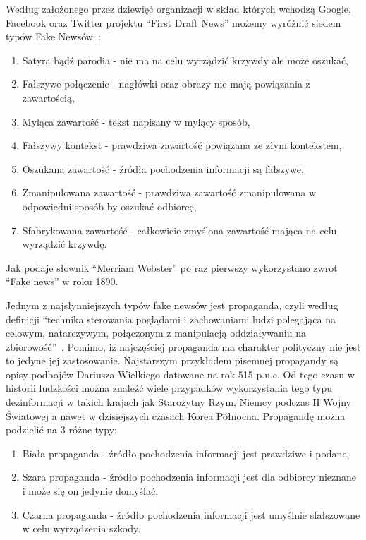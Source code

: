 Według założonego przez dziewięć organizacji w skład których wchodzą 
Google, Facebook oraz Twitter projektu ``First Draft News''
możemy wyróżnić siedem typów Fake Newsów~\cite{TypesOfFakeNews}:
\begin{enumerate}
    \item Satyra bądź parodia - nie ma na celu wyrządzić krzywdy ale może oszukać,
    \item Fałszywe połączenie - nagłówki oraz obrazy nie mają powiązania z zawartością,
    \item Myląca zawartość - tekst napisany w mylący sposób,
    \item Fałszywy kontekst - prawdziwa zawartość powiązana ze złym kontekstem,
    \item Oszukana zawartość - źródła pochodzenia informacji są fałszywe,
    \item Zmanipulowana zawartość - prawdziwa zawartość zmanipulowana w odpowiedni sposób by oszukać odbiorcę,
    \item Sfabrykowana zawartość - całkowicie zmyślona zawartość mająca na celu wyrządzić krzywdę.
\end{enumerate}
Jak podaje słownik ``Merriam Webster'' po raz pierwszy wykorzystano zwrot
``Fake news'' w roku 1890.


Jednym z najsłynniejszych typów fake newsów jest propaganda, czyli według 
definicji ``technika sterowania poglądami i zachowaniami ludzi polegająca na 
celowym, natarczywym, połączonym z manipulacją oddziaływaniu na zbiorowość''~\cite{SJP}.
Pomimo, iż najczęściej propaganda ma charakter polityczny nie jest to jedyne 
jej zastosowanie. Najstarszym przykładem pisemnej propagandy są opisy podbojów
Dariusza Wielkiego datowane na rok 515 p.n.e. Od tego czasu w historii ludzkości
można znaleźć wiele przypadków wykorzystania tego typu dezinformacji w takich krajach
jak Starożytny Rzym, Niemcy podczas II Wojny Światowej a nawet w dzisiejszych 
czasach Korea Północna.
Propagandę można podzielić na 3 różne typy:
\begin{enumerate}
    \item Biała propaganda - źródło pochodzenia informacji jest prawdziwe i podane,
    \item Szara propaganda - źródło pochodzenia informacji jest dla odbiorcy nieznane i może się on jedynie domyślać,
    \item Czarna propaganda - źródło pochodzenia informacji jest umyślnie sfałszowane w celu wyrządzenia szkody.
\end{enumerate}


